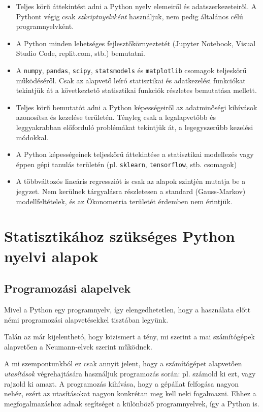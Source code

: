 \documentclass[
]{book}
\providecommand{\tightlist}{%
  \setlength{\itemsep}{0pt}\setlength{\parskip}{0pt}}
\begin{document}
\begin{itemize}
\tightlist
\item
  Teljes körű áttekintést adni a Python nyelv elemeiről és adatszerkezeteiről. A Pythont végig csak \emph{szkriptnyelvként} használjuk, nem pedig általános célú programnyelvként.
\item
  A Python minden lehetséges fejlesztőkörnyeztetét (Jupyter Notebook, Visual Studio Code, replit.com, stb.) bemutatni.
\item
  A \texttt{numpy}, \texttt{pandas}, \texttt{scipy}, \texttt{statsmodels} és \texttt{matplotlib} csomagok teljeskörű működéséről. Csak az alapvető leíró statisztikai és adatkezelési funkciókat tekintjük át a következtető statisztikai funkciók részletes bemutatása mellett.
\item
  Teljes körű bemutatót adni a Python képességeiről az adatminőségi kihívások azonosítsa és kezelése területén. Tényleg csak a legalapvetőbb és leggyakrabban előforduló problémákat tekintjük át, a legegyszerűbb kezelési módokkal.
\item
  A Python képességeinek teljeskörű áttekintése a statisztikai modellezés vagy éppen gépi tanulás területén (pl. \texttt{sklearn}, \texttt{tensorflow}, stb. csomagok)
\item
  A többváltozós lineáris regressziót is csak az alapok szintjén mutatja be a jegyzet. Nem kerülnek tárgyalásra részletesen a standard (Gauss-Markov) modellfeltételek, és az Ökonometria területét érdemben nem érintjük.
\end{itemize}

\chapter{Statisztikához szükséges Python nyelvi alapok}\label{statisztikuxe1hoz-szuxfcksuxe9ges-python-nyelvi-alapok}

\section{Programozási alapelvek}\label{programozuxe1si-alapelvek}

Mivel a Python egy programnyelv, így elengedhetetlen, hogy a használata előtt némi programozási alapvetésekkel tisztában legyünk.

Talán az már kijelenthetó, hogy közismert a tény, mi szerint a mai számítógépek alapvetően a Neumann-elvek szerint működnek.

A mi szempontunkból ez csak annyit jelent, hogy a számítógépet alapvetően \emph{utasítások} végrehajtására használjuk programozás során: pl. számold ki ezt, vagy rajzold ki amazt. A programozás kihívása, hogy a gépállat felfogása nagyon nehéz, ezért az utasításokat nagyon konkrétan meg kell neki fogalmazni. Ehhez a megfogalmazáshoz adnak segítséget a különböző programnyelvek, így a Python is.
\end{document}
